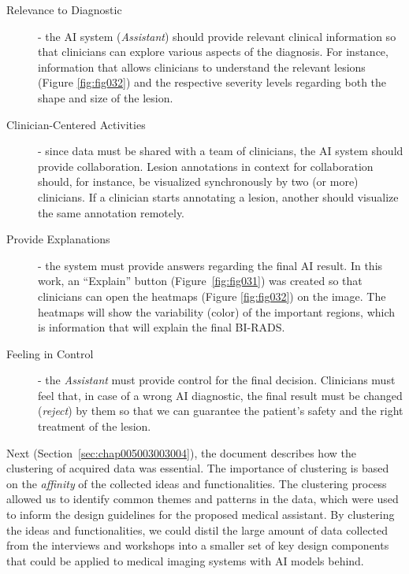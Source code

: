 \begin{description}
\item[Relevance to Diagnostic] - the AI system ({\it Assistant}) should provide relevant clinical information so that clinicians can explore various aspects of the diagnosis.
For instance, information that allows clinicians to understand the relevant lesions (Figure \ref{fig:fig032}) and the respective severity levels regarding both the shape and size of the lesion.

\vspace{1.50mm}

\item[Clinician-Centered Activities] - since data must be shared with a team of clinicians, the \ac{AI} system should provide collaboration. Lesion annotations in context for collaboration should, for instance, be visualized synchronously by two (or more) clinicians. If a clinician starts annotating a lesion, another should visualize the same annotation remotely.

\vspace{1.50mm}

\item[Provide Explanations] - the system must provide answers regarding the final \ac{AI} result. In this work, an ``Explain'' button (Figure~\ref{fig:fig031}) was created so that clinicians can open the heatmaps (Figure \ref{fig:fig032}) on the image. The heatmaps will show the variability (color) of the important regions, which is information that will explain the final \ac{BI-RADS}.

\vspace{1.50mm}

\item[Feeling in Control] - the {\it Assistant} must provide control for the final decision. Clinicians must feel that, in case of a wrong \ac{AI} diagnostic, the final result must be changed ({\it reject}) by them so that we can guarantee the patient's safety and the right treatment of the lesion.
\end{description}

\vspace{2.00mm}

Next (Section~\ref{sec:chap005003003004}), the document describes how the clustering of acquired data was essential.
The importance of clustering is based on the {\it affinity} of the collected ideas and functionalities.
The clustering process allowed us to identify common themes and patterns in the data, which were used to inform the design guidelines for the proposed medical assistant.
By clustering the ideas and functionalities, we could distil the large amount of data collected from the interviews and workshops into a smaller set of key design components that could be applied to medical imaging systems with \ac{AI} models behind.

